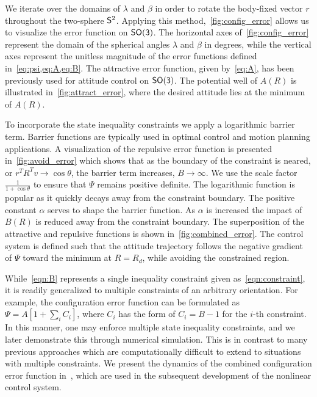 We iterate over the domains of \( \lambda\) and \(\beta\) in order to rotate the body-fixed vector \( r \) throughout the two-sphere \( \S^2 \).
Applying this method,~\cref{fig:config_error} allows us to visualize the error function on \( \SO \).
The horizontal axes of~\cref{fig:config_error} represent the domain of the spherical angles \( \lambda \) and \( \beta \) in degrees, while the vertical axes represent the unitless magnitude of the error functions defined in~\cref{eq:psi,eq:A,eq:B}.
The attractive error function, given by~\cref{eq:A}, has been previously used for attitude control on \(\SO\).
The potential well of \( A(R)\) is illustrated in~\cref{fig:attract_error}, where the desired attitude lies at the minimum of \( A(R) \).

To incorporate the state inequality constraints we apply a logarithmic barrier term.
Barrier functions are typically used in optimal control and motion planning applications.
A visualization of the repulsive error function is presented in~\cref{fig:avoid_error} which shows that as the boundary of the constraint is neared, or \( r^T R^T v \to \cos \theta \), the barrier term increases, \( B \to \infty\).
We use the scale factor~\(\frac{1}{1+\cos \theta} \) to ensure that \( \Psi \) remains positive definite.
The logarithmic function is popular as it quickly decays away from the constraint boundary.
The positive constant \( \alpha \) serves to shape the barrier function.
As \( \alpha \) is increased the impact of \( B(R) \) is reduced away from the constraint boundary. 
The superposition of the attractive and repulsive functions is shown in~\cref{fig:combined_error}.
The control system is defined such that the attitude trajectory follows the negative gradient of \( \Psi \) toward the minimum at \( R = R_d \), while avoiding the constrained region.

While~\cref{eqn:B} represents a single inequality constraint given as~\cref{eqn:constraint}, it is readily generalized to multiple constraints of an arbitrary orientation. 
For example, the configuration error function can be formulated as $\Psi=A[1+\sum_i C_i]$, where $C_i$ has the form of $C_i=B-1$ for the $i$-th constraint. 
In this manner, one may enforce multiple state inequality constraints, and we later demonstrate this through numerical simulation. 
This is in contrast to many previous approaches which are computationally difficult to extend to situations with multiple constraints.
We present the dynamics of the combined configuration error function in~, which are used in the subsequent development of the nonlinear control system.

